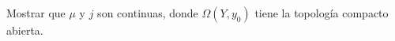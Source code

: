 \begin{ejercicio}
    Mostrar que $\mu$ y $j$ son continuas, donde $\Omega(Y,y_0)$ tiene la topología compacto abierta.
\end{ejercicio}

\begin{demostracion}

\end{demostracion}

